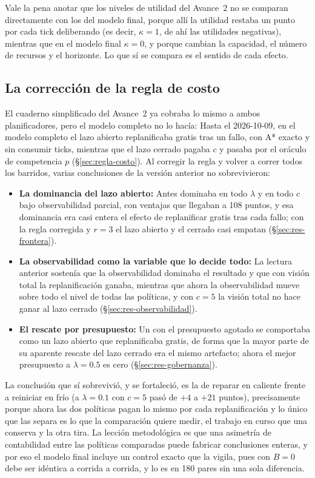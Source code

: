 Vale la pena anotar que los niveles de utilidad del Avance~2 no se comparan directamente con los del modelo final, porque allí la utilidad restaba un punto por cada tick deliberando (es decir, $\kappa=1$, de ahí las utilidades negativas), mientras que en el modelo final $\kappa=0$, y porque cambian la capacidad, el número de recursos y el horizonte. Lo que sí se compara es el sentido de cada efecto.

\subsection{La corrección de la regla de costo}

El cuaderno simplificado del Avance~2 ya cobraba lo mismo a ambos planificadores, pero el modelo completo no lo hacía: Hasta el 2026-10-09, en el modelo completo el lazo abierto replanificaba gratis tras un fallo, con A* exacto y sin consumir ticks, mientras que el lazo cerrado pagaba $c$ y pasaba por el oráculo de competencia $p$ (§\ref{sec:regla-costo}). Al corregir la regla y volver a correr todos los barridos, varias conclusiones de la versión anterior no sobrevivieron:

\begin{itemize}[leftmargin=1.4em, itemsep=0.2em]
  \item \textbf{La dominancia del lazo abierto:} Antes dominaba en todo $\lambda$ y en todo $c$ bajo observabilidad parcial, con ventajas que llegaban a 108 puntos, y esa dominancia era casi entera el efecto de replanificar gratis tras cada fallo; con la regla corregida y $r=3$ el lazo abierto y el cerrado casi empatan (§\ref{sec:res-frontera}).
  \item \textbf{La observabilidad como la variable que lo decide todo:} La lectura anterior sostenía que la observabilidad dominaba el resultado y que con visión total la replanificación ganaba, mientras que ahora la observabilidad mueve sobre todo el nivel de todas las políticas, y con $c=5$ la visión total no hace ganar al lazo cerrado (§\ref{sec:res-observabilidad}).
  \item \textbf{El rescate por presupuesto:} Un \GOV{} con el presupuesto agotado se comportaba como un lazo abierto que replanificaba gratis, de forma que la mayor parte de su aparente rescate del lazo cerrado era el mismo artefacto; ahora el mejor presupuesto a $\lambda=0.5$ es cero (§\ref{sec:res-gobernanza}).
\end{itemize}

La conclusión que sí sobrevivió, y se fortaleció, es la de reparar en caliente frente a reiniciar en frío (a $\lambda=0.1$ con $c=5$ pasó de $+4$ a $+21$ puntos), precisamente porque ahora las dos políticas pagan lo mismo por cada replanificación y lo único que las separa es lo que la comparación quiere medir, el trabajo en curso que una conserva y la otra tira. La lección metodológica es que una asimetría de contabilidad entre las políticas comparadas puede fabricar conclusiones enteras, y por eso el modelo final incluye un control exacto que la vigila, pues con $B=0$ \GOV{} debe ser idéntica a \OL{} corrida a corrida, y lo es en 180 pares sin una sola diferencia.

